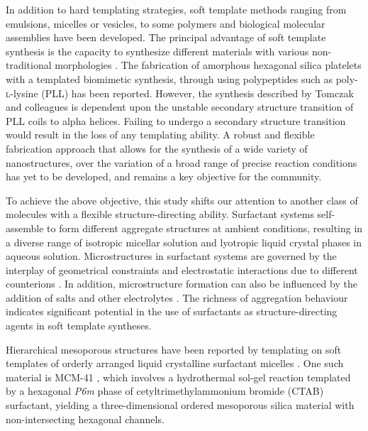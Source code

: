\documentclass[a4paper,12pt,twocolumn]{article}
\begin{document}
In addition to hard templating strategies, soft template methods ranging from emulsions, micelles or vesicles, to some polymers and biological molecular assemblies have been developed. The principal advantage of soft template synthesis is the capacity to synthesize different materials with various non-traditional morphologies \cite{wan2007}. The fabrication of amorphous hexagonal silica platelets with a templated biomimetic synthesis, through using polypeptides such as poly-\textsc{l}-lysine (PLL) \cite{tomczak2005,bellomo2006} has been reported. However, the synthesis described by Tomczak and colleagues is dependent upon the unstable secondary structure transition of PLL coils to alpha helices. Failing to undergo a secondary structure transition would result in the loss of any templating ability. A robust and flexible fabrication approach that allows for the synthesis of a wide variety of nanostructures, over the variation of a broad range of precise reaction conditions has yet to be developed, and remains a key objective for the community.

To achieve the above objective, this study shifts our attention to another class of molecules with a flexible structure-directing ability. Surfactant systems self-assemble to form different aggregate structures at ambient conditions, resulting in a diverse range of isotropic micellar solution and lyotropic liquid crystal phases in aqueous solution. Microstructures in surfactant systems are governed by the interplay of geometrical constraints \cite{israelachvili1976} and electrostatic interactions due to different counterions \cite{kang1993}. In addition, microstructure formation can also be influenced by the addition of salts and other electrolytes \cite{thalberg1991}. The richness of aggregation behaviour indicates significant potential in the use of surfactants as structure-directing agents in soft template syntheses. 

Hierarchical mesoporous structures have been reported by templating on soft templates of orderly arranged liquid crystalline surfactant micelles \cite{colfen2007}. One such material is MCM-41 \cite{kresge1992}, which involves a hydrothermal sol-gel reaction templated by a hexagonal \textit{P6m} phase of cetyltrimethylammonium bromide (CTAB) surfactant, yielding a three-dimensional ordered mesoporous silica material with non-intersecting hexagonal channels. 
\end{document}
